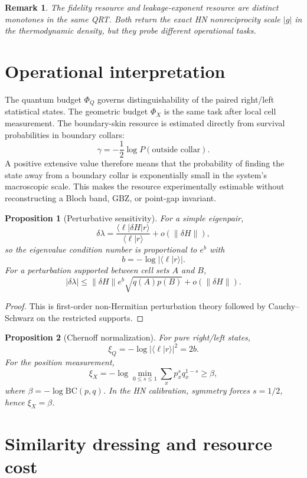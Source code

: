 \documentclass[11pt]{article}
\newtheorem{proposition}{Proposition}
\newtheorem{remark}{Remark}
\newcommand{\BC}{\mathrm{BC}}
\begin{document}
\begin{remark}
The fidelity resource and leakage-exponent resource are distinct monotones in the same QRT. Both return the exact HN nonreciprocity scale $|g|$ in the thermodynamic density, but they probe different operational tasks.
\end{remark}

\section{Operational interpretation}

The quantum budget $\Phi_Q$ governs distinguishability of the paired right/left statistical states. The geometric budget $\Phi_X$ is the same task after local cell measurement. The boundary-skin resource is estimated directly from survival probabilities in boundary collars:
\[
\gamma=-\frac12\log P(\text{outside collar}).
\]
A positive extensive value therefore means that the probability of finding the state away from a boundary collar is exponentially small in the system's macroscopic scale. This makes the resource experimentally estimable without reconstructing a Bloch band, GBZ, or point-gap invariant.

\begin{proposition}[Perturbative sensitivity]
For a simple eigenpair,
\[
\delta\lambda
=
\frac{\langle\ell|\delta H|r\rangle}{\langle\ell|r\rangle}
+o(\|\delta H\|),
\]
so the eigenvalue condition number is proportional to $e^{b}$ with
\[
b=-\log|\langle\ell|r\rangle|.
\]
For a perturbation supported between cell sets $A$ and $B$,
\[
|\delta\lambda|
\le
\|\delta H\|e^b\sqrt{q(A)p(B)}
+o(\|\delta H\|).
\]
\end{proposition}

\begin{proof}
This is first-order non-Hermitian perturbation theory followed by Cauchy--Schwarz on the restricted supports.
\end{proof}

\begin{proposition}[Chernoff normalization]
For pure right/left states,
\[
\xi_Q=-\log|\langle\ell|r\rangle|^2=2b.
\]
For the position measurement,
\[
\xi_X
=-\log\min_{0\le s\le1}\sum_xp_x^sq_x^{1-s}
\ge\beta,
\]
where $\beta=-\log\BC(p,q)$. In the HN calibration, symmetry forces $s=1/2$, hence $\xi_X=\beta$.
\end{proposition}

\section{Similarity dressing and resource cost}
\end{document}
